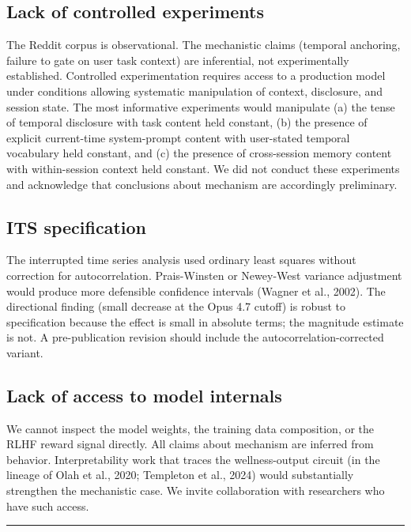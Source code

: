 \documentclass{obelus-preprint}
\begin{document}
\subsection{Lack of controlled experiments}
The Reddit corpus is observational. The mechanistic claims (temporal anchoring, failure to gate on user task context) are inferential, not experimentally established. Controlled experimentation requires access to a production model under conditions allowing systematic manipulation of context, disclosure, and session state. The most informative experiments would manipulate (a) the tense of temporal disclosure with task content held constant, (b) the presence of explicit current-time system-prompt content with user-stated temporal vocabulary held constant, and (c) the presence of cross-session memory content with within-session context held constant. We did not conduct these experiments and acknowledge that conclusions about mechanism are accordingly preliminary.
\subsection{ITS specification}
The interrupted time series analysis used ordinary least squares without correction for autocorrelation. Prais-Winsten or Newey-West variance adjustment would produce more defensible confidence intervals (Wagner et al., 2002). The directional finding (small decrease at the Opus 4.7 cutoff) is robust to specification because the effect is small in absolute terms; the magnitude estimate is not. A pre-publication revision should include the autocorrelation-corrected variant.
\subsection{Lack of access to model internals}
We cannot inspect the model weights, the training data composition, or the RLHF reward signal directly. All claims about mechanism are inferred from behavior. Interpretability work that traces the wellness-output circuit (in the lineage of Olah et al., 2020; Templeton et al., 2024) would substantially strengthen the mechanistic case. We invite collaboration with researchers who have such access.
\bigskip\hrule\bigskip
\end{document}
